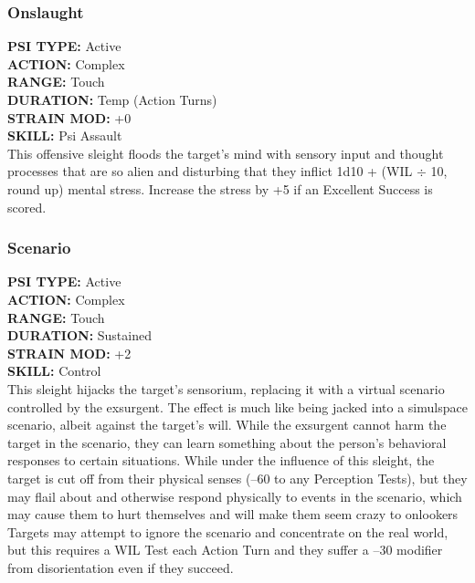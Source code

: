 \subsubsection{Onslaught}
\textbf{PSI TYPE:} Active \\
\textbf{ACTION:} Complex \\
\textbf{RANGE:} Touch \\
\textbf{DURATION:} Temp (Action Turns) \\
\textbf{STRAIN MOD:} +0 \\
\textbf{SKILL:} Psi Assault \\
This offensive sleight floods the target's mind with 
sensory input and thought processes that are so alien 
and disturbing that they inflict 1d10 + (WIL $\div$ 10, 
round up) mental stress. Increase the stress by +5 if an 
Excellent Success is scored.

\subsubsection{Scenario }
\textbf{PSI TYPE:} Active \\
\textbf{ACTION:} Complex \\
\textbf{RANGE:} Touch \\
\textbf{DURATION:} Sustained \\
\textbf{STRAIN MOD:} +2 \\
\textbf{SKILL:} Control \\
This sleight hijacks the target's sensorium, replacing 
it with a virtual scenario controlled by the exsurgent. 
The effect is much like being jacked into a simulspace 
scenario, albeit against the target's will. While the 
exsurgent cannot harm the target in the scenario, they 
can learn something about the person's behavioral 
responses to certain situations. While under the influence
of this sleight, the target is cut off from their
physical senses (–60 to any Perception Tests), but they 
may flail about and otherwise respond physically to 
events in the scenario, which may cause them to hurt 
themselves and will make them seem crazy to onlookers
Targets may attempt to ignore the scenario and
concentrate on the real world, but this requires a WIL 
Test each Action Turn and they suffer a –30 modifier 
from disorientation even if they succeed. 

